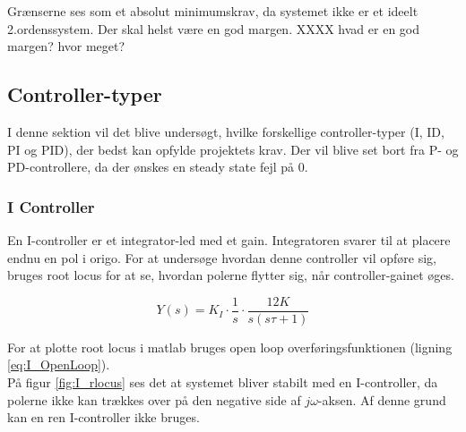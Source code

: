 Grænserne ses som et absolut minimumskrav, da systemet ikke er et ideelt 2.ordenssystem. Der skal helst være en god margen. XXXX hvad er en god margen? hvor meget?

\subsection{Controller-typer}

I denne sektion vil det blive undersøgt, hvilke forskellige controller-typer (I, ID, PI og PID), der bedst kan opfylde projektets krav. Der vil blive set bort fra P- og PD-controllere, da der ønskes en steady state fejl på 0. 

\subsubsection{I Controller}

En I-controller er et integrator-led med et gain. Integratoren svarer til at placere endnu en pol i origo. For at undersøge hvordan denne controller vil opføre sig, bruges root locus for at se, hvordan polerne flytter sig, når controller-gainet øges.

\begin{equation}\label{eq:I_OpenLoop}
Y(s)=K_{I}\cdot\frac{1}{s}\cdot\frac{12K}{s(s\tau+1)}
\end{equation}

For at plotte root locus i matlab bruges open loop overføringsfunktionen (ligning \ref{eq:I_OpenLoop}).\\ På figur \ref{fig:I_rlocus} ses det at systemet bliver stabilt med en I-controller, da polerne ikke kan trækkes over på den negative side af $j\omega$-aksen. Af denne grund kan en ren I-controller ikke bruges.

